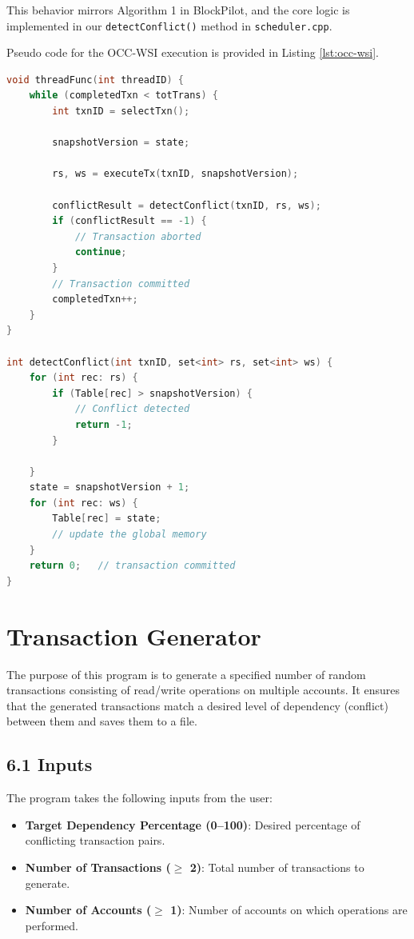 \documentclass[12pt]{article}
\begin{document}
This behavior mirrors Algorithm 1 in BlockPilot, and the core logic is implemented in our \texttt{detectConflict()} method in \texttt{scheduler.cpp}.

Pseudo code for the OCC-WSI execution is provided in Listing \ref{lst:occ-wsi}.

\begin{tcolorbox}
\begin{lstlisting}[language=C++, caption={Pseudo code for OCC-WSI Execution}, label={lst:occ-wsi}]
void threadFunc(int threadID) {
    while (completedTxn < totTrans) {
        int txnID = selectTxn();

        snapshotVersion = state;

        rs, ws = executeTx(txnID, snapshotVersion);

        conflictResult = detectConflict(txnID, rs, ws);
        if (conflictResult == -1) {
            // Transaction aborted
            continue;
        }
        // Transaction committed
        completedTxn++;
    }
}

int detectConflict(int txnID, set<int> rs, set<int> ws) {
    for (int rec: rs) {
        if (Table[rec] > snapshotVersion) {
            // Conflict detected
            return -1;
        }
        
    }
    state = snapshotVersion + 1;
    for (int rec: ws) {
        Table[rec] = state;
        // update the global memory
    }
    return 0;   // transaction committed
}

\end{lstlisting}
\end{tcolorbox}



\section{Transaction Generator}
The purpose of this program is to generate a specified number of random transactions consisting of read/write operations on multiple accounts. It ensures that the generated transactions match a desired level of dependency (conflict) between them and saves them to a file.

\subsection*{6.1 Inputs}
The program takes the following inputs from the user:
\begin{itemize}
    \item \textbf{Target Dependency Percentage (0--100)}: Desired percentage of conflicting transaction pairs.
    \item \textbf{Number of Transactions ($\geq$ 2)}: Total number of transactions to generate.
    \item \textbf{Number of Accounts ($\geq$ 1)}: Number of accounts on which operations are performed.
\end{itemize}
\end{document}
